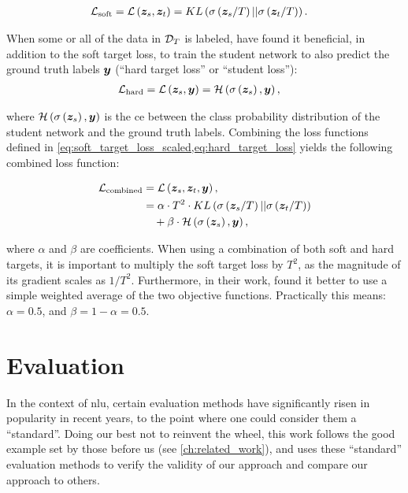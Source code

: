 \begin{align}
    \label{eq:soft_target_loss_scaled}
    \mathcal{L}_{\text{soft}} = \loss{\vect{z}_s, \vect{z}_t} &= KL\left( \softmax{\vect{z}_s / T} || \softmax{\vect{z}_t / T} \right).
\end{align}

When some or all of the data in $\mathcal{D}_T$ is labeled, \citet{hinton2015distilling} have found it beneficial, in addition to the soft target loss, to train the student network to also predict the ground truth labels $\vect{y}$ (``hard target loss'' or ``student loss''):
\begin{align}
    \label{eq:hard_target_loss}
    \mathcal{L}_{\text{hard}} = \loss{\vect{z}_s, \vect{y}} &= \ce{\softmax{\vect{z}_s}, \vect{y}},
\end{align}

where $\ce{\softmax{\vect{z}_s}, \vect{y}}$ is the \gls{ce} between the class probability distribution of the student network and the ground truth labels. Combining the loss functions defined in \cref{eq:soft_target_loss_scaled,eq:hard_target_loss} yields the following combined loss function:
 
\begin{align}
    \label{eq:combined_kd_loss}
    \mathcal{L}_{\text{combined}} &= \loss{\vect{z}_s, \vect{z}_t, \vect{y}}, \nonumber \\
    &= \alpha \cdot T^2 \cdot KL\left( \softmax{\vect{z}_s / T} || \softmax{\vect{z}_t / T} \right) \nonumber \\
    &\quad + \beta \cdot \ce{\softmax{\vect{z}_s}, \vect{y}},  
\end{align}

where $\alpha$ and $\beta$ are coefficients. When using a combination of both soft and hard targets, it is important to multiply the soft target loss by $T^2$, as the magnitude of its gradient scales as $1/T^2$. Furthermore, in their work, \citet{hinton2015distilling} found it better to use a simple weighted average of the two objective functions. Practically this means: $\alpha = 0.5$, and $\beta = 1 - \alpha = 0.5$.



\section{Evaluation}
\label{sec:evaluation}
In the context of \gls{nlu}, certain evaluation methods have significantly risen in popularity in recent years, to the point where one could consider them a ``standard''. Doing our best not to reinvent the wheel, this work follows the good example set by those before us (see \cref{ch:related_work}), and uses these ``standard'' evaluation methods to verify the validity of our approach and compare our approach to others.

